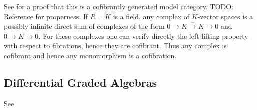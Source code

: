 \documentclass{scrartcl}
\theoremstyle{plain}
\theoremstyle{definition}
\DeclareMathOperator{\Ch}{Ch}
\let\xto\xrightarrow
\begin{document}
See \cite[Subsection 2.3]{hovey2007model} for a proof that this is a cofibrantly generated model category. TODO: Reference for properness.
If $R=K$ is a field, any complex of $K$-vector spaces is a possibly infinite direct sum of complexes of the form $0\to K\xto{\sim} K\to 0$ and $0\to K \to 0$. For these complexes one can verify directly the left lifting property with respect to fibrations, hence they are cofibrant. Thus any complex is cofibrant and hence any monomorphism is a cofibration. 


\subsection{Differential Graded Algebras}
See \cite{jf1997closed}
\end{document}

